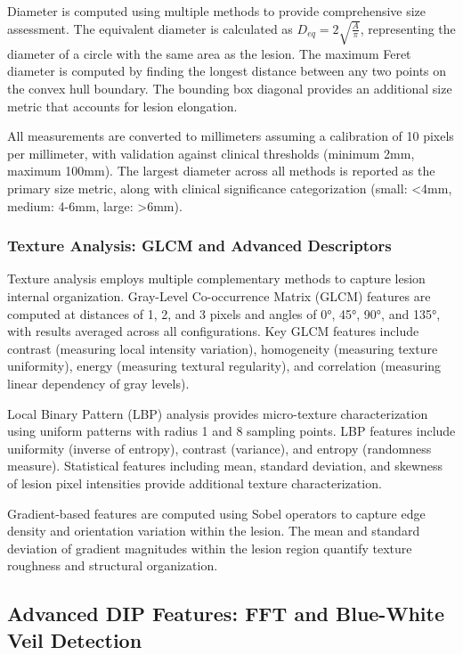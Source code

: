 \documentclass[conference]{IEEEtran}
\begin{document}
Diameter is computed using multiple methods to provide comprehensive size assessment. The equivalent diameter is calculated as $D_{eq} = 2\sqrt{\frac{A}{\pi}}$, representing the diameter of a circle with the same area as the lesion. The maximum Feret diameter is computed by finding the longest distance between any two points on the convex hull boundary. The bounding box diagonal provides an additional size metric that accounts for lesion elongation.

All measurements are converted to millimeters assuming a calibration of 10 pixels per millimeter, with validation against clinical thresholds (minimum 2mm, maximum 100mm). The largest diameter across all methods is reported as the primary size metric, along with clinical significance categorization (small: <4mm, medium: 4-6mm, large: >6mm).

\subsubsection{Texture Analysis: GLCM and Advanced Descriptors}

Texture analysis employs multiple complementary methods to capture lesion internal organization. Gray-Level Co-occurrence Matrix (GLCM) features are computed at distances of 1, 2, and 3 pixels and angles of 0°, 45°, 90°, and 135°, with results averaged across all configurations. Key GLCM features include contrast (measuring local intensity variation), homogeneity (measuring texture uniformity), energy (measuring textural regularity), and correlation (measuring linear dependency of gray levels).

Local Binary Pattern (LBP) analysis provides micro-texture characterization using uniform patterns with radius 1 and 8 sampling points. LBP features include uniformity (inverse of entropy), contrast (variance), and entropy (randomness measure). Statistical features including mean, standard deviation, and skewness of lesion pixel intensities provide additional texture characterization.

Gradient-based features are computed using Sobel operators to capture edge density and orientation variation within the lesion. The mean and standard deviation of gradient magnitudes within the lesion region quantify texture roughness and structural organization.

\subsection{Advanced DIP Features: FFT and Blue-White Veil Detection}
\end{document}
